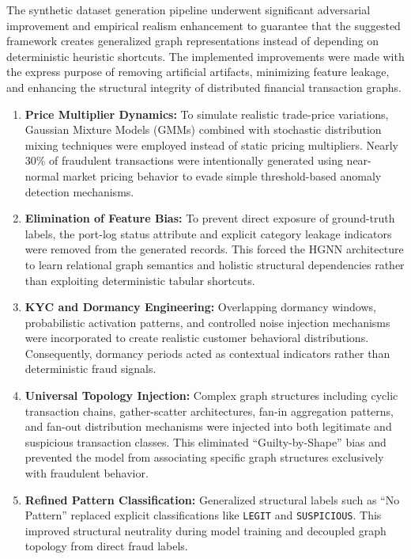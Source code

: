 \documentclass[conference]{IEEEtran}
\begin{document}
The synthetic dataset generation pipeline underwent significant adversarial improvement and empirical realism enhancement to guarantee that the suggested framework creates generalized graph representations instead of depending on deterministic heuristic shortcuts. The implemented improvements were made with the express purpose of removing artificial artifacts, minimizing feature leakage, and enhancing the structural integrity of distributed financial transaction graphs.
\begin{enumerate}

\item \textbf{Price Multiplier Dynamics:}
To simulate realistic trade-price variations, Gaussian Mixture Models (GMMs) combined with stochastic distribution mixing techniques were employed instead of static pricing multipliers. Nearly 30\% of fraudulent transactions were intentionally generated using near-normal market pricing behavior to evade simple threshold-based anomaly detection mechanisms.

\item \textbf{Elimination of Feature Bias:}
To prevent direct exposure of ground-truth labels, the port-log status attribute and explicit category leakage indicators were removed from the generated records. This forced the HGNN architecture to learn relational graph semantics and holistic structural dependencies rather than exploiting deterministic tabular shortcuts.

\item \textbf{KYC and Dormancy Engineering:}
Overlapping dormancy windows, probabilistic activation patterns, and controlled noise injection mechanisms were incorporated to create realistic customer behavioral distributions. Consequently, dormancy periods acted as contextual indicators rather than deterministic fraud signals.

\item \textbf{Universal Topology Injection:}
Complex graph structures including cyclic transaction chains, gather-scatter architectures, fan-in aggregation patterns, and fan-out distribution mechanisms were injected into both legitimate and suspicious transaction classes. This eliminated ``Guilty-by-Shape'' bias and prevented the model from associating specific graph structures exclusively with fraudulent behavior.

\item \textbf{Refined Pattern Classification:}
Generalized structural labels such as ``No Pattern'' replaced explicit classifications like \texttt{LEGIT} and \texttt{SUSPICIOUS}. This improved structural neutrality during model training and decoupled graph topology from direct fraud labels.


\end{enumerate}
\end{document}
